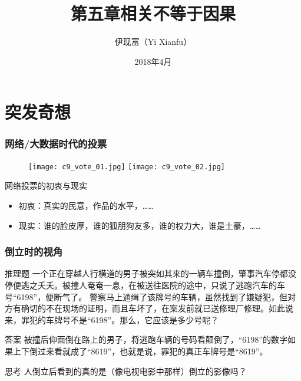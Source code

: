 



\title[相关 vs. 因果]{第五章\quad 相关不等于因果}
\author[Yixf]{伊现富（Yi Xianfu）}
\date{2018年4月}



\section{突发奇想}
\begin{frame}
  \frametitle{网络/大数据时代的投票}
  \begin{figure}
    \centering
    \texttt{[image: c9\_vote\_01.jpg]}
    \texttt{[image: c9\_vote\_02.jpg]}
  \end{figure}
  \pause
  \begin{block}{网络投票的初衷与现实}
    \begin{itemize}
      \item 初衷：真实的民意，作品的水平，……
      \item 现实：谁的脸皮厚，谁的狐朋狗友多，谁的权力大，谁是土豪，……
    \end{itemize}
  \end{block}
\end{frame}

\begin{frame}
  \frametitle{倒立时的视角}
   \begin{block}{推理题}
一个正在穿越人行横道的男子被突如其来的一辆车撞倒，肇事汽车停都没停便逃之夭夭。被撞人奄奄一息，在被送往医院的途中，只说了逃跑汽车的车号“6198”，便断气了。
警察马上通缉了该牌号的车辆，虽然找到了嫌疑犯，但对方有确切的不在现场的证明，而且车坏了，在案发前就已送修理厂修理。如此说来，罪犯的车牌号不是“6198”。那么，它应该是多少号呢？
   \end{block} 
   \pause
   \pause
   \pause
   \begin{block}{答案}
被撞后仰面倒在路上的男子，将逃跑车辆的号码看颠倒了，“6198”的数字如果上下倒过来看就成了“8619”，也就是说，罪犯的真正车牌号是“8619”。
   \end{block}
   \pause
   \begin{block}{思考}
     人倒立后看到的真的是（像电视电影中那样）倒立的影像吗？
   \end{block}
\end{frame}

